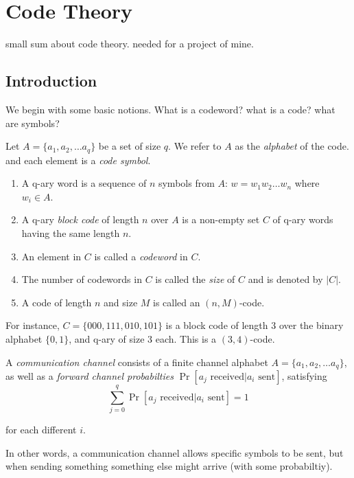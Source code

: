\chapter{Code Theory}

small sum about code theory. needed for a project of mine.

\section{Introduction}
We begin with some basic notions. What is a codeword? what is a code? what are symbols?
\begin{definition}
    Let $A=\{a_1, a_2, \dots a_q \}$ be a set of size $q$.
    We refer to $A$ as the \emph{alphabet} of the code. and each element is a \emph{code symbol}.

    \begin{enumerate}
        \item A q-ary word is a sequence of $n$ symbols from $A$:  $w=w_1w_2\dots w_n$ 
        where $w_i\in A$.
        \item A q-ary \emph{block code} of length $n$ over $A$ is a non-empty set $C$ of q-ary words
        having the same length $n$.
        \item An element in $C$ is called a \emph{codeword} in $C$.
        \item The number of codewords in $C$ is called the \emph{size} of $C$ and is denoted by $|C|$.
        \item A code of length $n$ and size $M$ is called an $(n,M)$-code.
    \end{enumerate}
\end{definition}

For instance, $C=\{000, 111, 010, 101\}$ is a block code of length $3$ over the binary alphabet $\{0,1\}$,
and q-ary of size $3$ each. This is a $(3,4)$-code.

\begin{definition}
A \emph{communication channel} consists of a finite channel alphabet $A=\{a_1, a_2, \dots a_q \}$, 
as well as a \emph{forward channel probabilties} $\Pr[a_j\text{ received}| a_i\text{ sent}]$, satisfying
$$ \sum_{j=0}^q \Pr[a_j\text{ received}| a_i\text{ sent}] = 1$$

for each different $i$.
\end{definition}

In other words, a communication channel allows specific symbols to be sent, but when sending something 
something else might arrive (with some probabiltiy).

